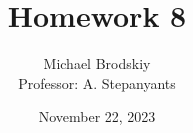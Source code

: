 


\title{Homework 8}
\date{November 22, 2023}
\author{Michael Brodskiy\\ \small Professor: A. Stepanyants}



\maketitle

